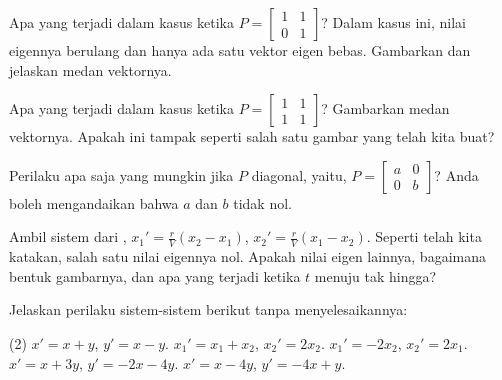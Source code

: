 \begin{exercise}
\pagebreak[2]
Apa yang terjadi dalam kasus ketika $P = 
\left[ \begin{smallmatrix} 1 & 1 \\ 0 & 1 \end{smallmatrix} \right]$?  Dalam
kasus ini, nilai eigennya berulang dan hanya ada satu vektor eigen bebas.
Gambarkan dan jelaskan medan vektornya.
\end{exercise}

\begin{exercise}
Apa yang terjadi dalam kasus ketika $P = 
\left[ \begin{smallmatrix} 1 & 1 \\ 1 & 1 \end{smallmatrix} \right]$?
Gambarkan medan vektornya.
Apakah ini tampak seperti salah satu gambar yang telah kita buat?
\end{exercise}

\begin{exercise}
Perilaku apa saja yang mungkin jika $P$ diagonal, yaitu,
$P = \left[ \begin{smallmatrix} a & 0 \\ 0 & b \end{smallmatrix} \right]$?
Anda boleh mengandaikan bahwa $a$ dan $b$ tidak nol.
\end{exercise}

\begin{exercise}
Ambil sistem dari ,
$x_1'=\frac{r}{V}(x_2-x_1)$,
$x_2'=\frac{r}{V}(x_1-x_2)$.
Seperti telah kita katakan, salah satu nilai eigennya nol.  Apakah nilai eigen lainnya, bagaimana
bentuk gambarnya, dan apa yang terjadi ketika $t$ menuju tak hingga?
\end{exercise}

\setcounter{exercise}{100}

\begin{exercise}
Jelaskan perilaku sistem-sistem berikut tanpa menyelesaikannya:
\begin{tasks}(2)
\task $x' = x + y$, \quad $y' = x-y$.
\task $x_1' = x_1 + x_2$, \quad $x_2' = 2 x_2$.
\task $x_1' = -2x_2$, \quad $x_2' = 2 x_1$.
\task $x' = x + 3y$, \quad $y' = -2x-4y$.
\task $x' = x - 4y$, \quad $y' = -4x+y$.
\end{tasks}
\end{exercise}

